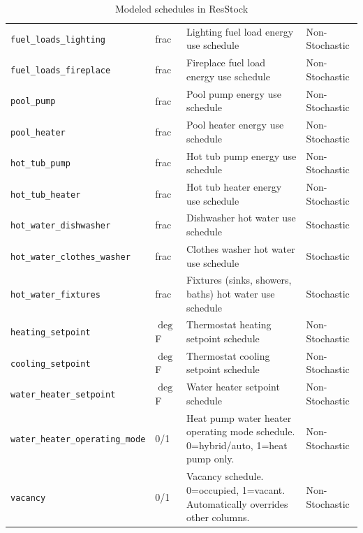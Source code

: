 \begin{table}
\begin{tabular}{l|l|l|l}
    \texttt{fuel\_loads\_lighting} & frac & Lighting fuel load energy use schedule & Non-Stochastic \\
    \texttt{fuel\_loads\_fireplace} & frac & Fireplace fuel load energy use schedule & Non-Stochastic \\
    \texttt{pool\_pump} & frac & Pool pump energy use schedule & Non-Stochastic \\
    \texttt{pool\_heater} & frac & Pool heater energy use schedule & Non-Stochastic \\
    \texttt{hot\_tub\_pump} & frac & Hot tub pump energy use schedule & Non-Stochastic \\
    \texttt{hot\_tub\_heater} & frac & Hot tub heater energy use schedule & Non-Stochastic \\
    \texttt{hot\_water\_dishwasher} & frac & Dishwasher hot water use schedule & Stochastic \\
    \texttt{hot\_water\_clothes\_washer} & frac & Clothes washer hot water use schedule & Stochastic \\ \texttt{hot\_water\_fixtures} & frac & Fixtures (sinks, showers, baths) hot water use schedule & Stochastic \\
    \texttt{heating\_setpoint} & $\deg$ F & Thermostat heating setpoint schedule & Non-Stochastic \\
    \texttt{cooling\_setpoint} & $\deg$ F & Thermostat cooling setpoint schedule & Non-Stochastic \\
    \texttt{water\_heater\_setpoint} & $\deg$ F & Water heater setpoint schedule & Non-Stochastic \\
    \texttt{water\_heater\_operating\_mode} & 0/1 & Heat pump water heater operating mode schedule. 0=hybrid/auto, 1=heat pump only. & Non-Stochastic \\
    \texttt{vacancy} & 0/1 & Vacancy schedule. 0=occupied, 1=vacant. Automatically overrides other columns. & Non-Stochastic \\
    \hline
    \end{tabular}
    \caption{Modeled schedules in ResStock}
    \label{tab:schedules}
\end{table}


